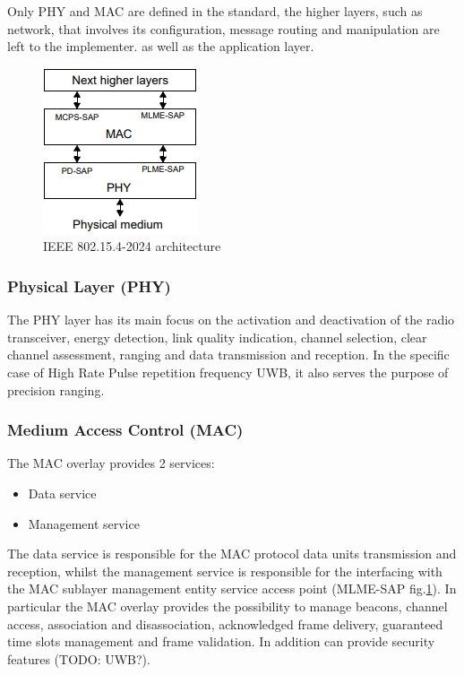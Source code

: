 \documentclass[conference]{IEEEtran}
\begin{document}
Only PHY and MAC are defined in the standard, the higher layers, such as network,
that involves its configuration, message routing and manipulation are left to the implementer.
as well as the application layer.\\

\begin{figure}[!h]
  \centering
  \includegraphics[width=.5\linewidth]{layers}
  \caption{IEEE 802.15.4-2024 architecture}
  \label{fig:layers}
\end{figure}

\subsubsection{Physical Layer (PHY)}
The PHY layer has its main focus on the activation and deactivation of the radio transceiver,
energy detection, link quality indication, channel selection, clear channel assessment,
ranging and data transmission and reception.
In the specific case of High Rate Pulse repetition frequency UWB, it also serves the purpose 
of precision ranging.

\subsubsection{Medium Access Control (MAC)}
The MAC overlay provides 2 services:
\begin{itemize}
    \item Data service
    \item Management service
\end{itemize}
The data service is responsible for the MAC protocol data units transmission and reception,
whilst the management service is responsible for the interfacing with the MAC sublayer 
management entity service access point (MLME-SAP fig.\ref{fig:layers}).
In particular the MAC overlay provides the possibility to manage beacons, channel access,
association and disassociation, acknowledged frame delivery, guaranteed time slots management
and frame validation. In addition can provide security features (TODO: UWB?).
\end{document}
